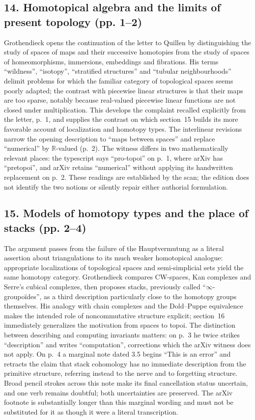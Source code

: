 \subsection*{14. Homotopical algebra and the limits of present topology (pp. 1--2)}
Grothendieck opens the continuation of the letter to Quillen by distinguishing the study of spaces of maps and their successive homotopies from the study of spaces of homeomorphisms, immersions, embeddings and fibrations. His terms ``wildness'', ``isotopy'', ``stratified structures'' and ``tubular neighbourhoods'' delimit problems for which the familiar category of topological spaces seems poorly adapted; the contrast with piecewise linear structures is that their maps are too sparse, notably because real-valued piecewise linear functions are not closed under multiplication. This develops the complaint recalled explicitly from the letter, p.~1, and supplies the contrast on which section~15 builds its more favorable account of localization and homotopy types. The interlinear revisions narrow the opening description to ``maps between spaces'' and replace ``numerical'' by $\mathbb R$-valued (p.~2). The witness differs in two mathematically relevant places: the typescript says ``pro-topoi'' on p.~1, where arXiv has ``pretopoi'', and arXiv retains ``numerical'' without applying its handwritten replacement on p.~2. These readings are established by the scan; the edition does not identify the two notions or silently repair either authorial formulation.

\subsection*{15. Models of homotopy types and the place of stacks (pp. 2--4)}
The argument passes from the failure of the Hauptvermutung as a literal assertion about triangulations to its much weaker homotopical analogue: appropriate localizations of topological spaces and semi-simplicial sets yield the same homotopy category. Grothendieck compares CW-spaces, Kan complexes and Serre's cubical complexes, then proposes stacks, previously called ``$\infty$-groupoïdes'', as a third description particularly close to the homotopy groups themselves. His analogy with chain complexes and the Dold--Puppe equivalence makes the intended role of noncommutative structure explicit; section~16 immediately generalizes the motivation from spaces to topoi. The distinction between describing and computing invariants matters: on p.~3 he twice strikes ``description'' and writes ``computation'', corrections which the arXiv witness does not apply. On p.~4 a marginal note dated 3.5 begins ``This is an error'' and retracts the claim that stack cohomology has no immediate description from the primitive structure, referring instead to the nerve and to forgetting structure. Broad pencil strokes across this note make its final cancellation status uncertain, and one verb remains doubtful; both uncertainties are preserved. The arXiv footnote is substantially longer than this marginal wording and must not be substituted for it as though it were a literal transcription.

